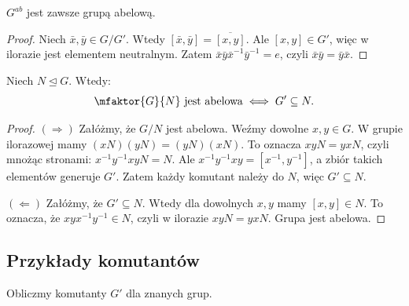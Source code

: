 \begin{corollary}
	$G^{ab}$ jest zawsze grupą abelową.
\end{corollary}
\begin{proof}
	Niech $\bar{x}, \bar{y} \in G/G'$. Wtedy $[\bar{x}, \bar{y}] = \overline{[x,y]}$. Ale $[x,y] \in G'$, więc w ilorazie jest elementem neutralnym. Zatem $\bar{x}\bar{y}\bar{x}^{-1}\bar{y}^{-1} = e$, czyli $\bar{x}\bar{y} = \bar{y}\bar{x}$.
\end{proof}

\begin{theorem}
	Niech $N\unlhd G $. Wtedy:
	\[ \mfaktor{G}{N} \text{ jest abelowa} \iff G' \subseteq N. \]
\end{theorem} 
\begin{proof}
	$(\Rightarrow)$ Załóżmy, że $G/N$ jest abelowa.
	Weźmy dowolne $x,y \in G$. W grupie ilorazowej mamy $(xN)(yN) = (yN)(xN)$.
	To oznacza $xyN = yxN$, czyli mnożąc stronami: $x^{-1}y^{-1}xyN = N$.
	Ale $x^{-1}y^{-1}xy = [x^{-1}, y^{-1}]$, a zbiór takich elementów generuje $G'$. 
	Zatem każdy komutant należy do $N$, więc $G' \subseteq N$.
	
	$(\Leftarrow)$ Załóżmy, że $G' \subseteq N$.
	Wtedy dla dowolnych $x,y$ mamy $[x,y] \in N$.
	To oznacza, że $xyx^{-1}y^{-1} \in N$, czyli w ilorazie $xyN = yxN$. Grupa jest abelowa.
\end{proof} 

\subsection{Przykłady komutantów}

Obliczmy komutanty $G'$ dla znanych grup.

